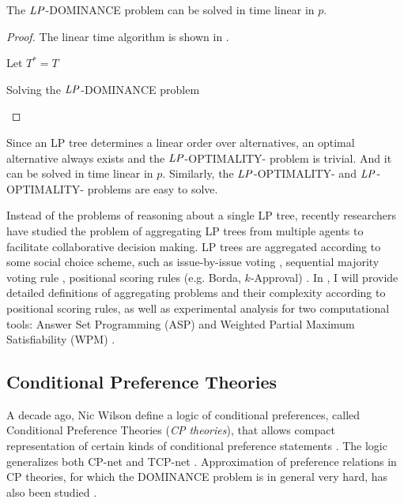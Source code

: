 \begin{thm}
\label{thm:LP_DOM}
	The $\mathit{LP}$-DOMINANCE problem can be solved in time linear in $p$.
\end{thm}
\begin{proof}
	The linear time algorithm is shown in .

	\begin{algorithm}[ht]
	Let $T^* = T$\;
	
	\caption{Solving the $\mathit{LP}$-DOMINANCE problem\label{alg:LP_dom}}
	\end{algorithm}
\end{proof}

Since an LP tree determines a linear order over alternatives, an optimal
alternative always exists and the $\mathit{LP}$-OPTIMALITY- problem
is trivial.  And it can be solved in time linear in $p$.
Similarly, the $\mathit{LP}$-OPTIMALITY- and
$\mathit{LP}$-OPTIMALITY- problems are easy to solve.

Instead of the problems of reasoning about a single
LP tree, recently researchers have studied
the problem of aggregating LP trees from multiple
agents to facilitate collaborative decision making.
LP trees are aggregated
according to some social choice scheme, such as
issue-by-issue voting \cite{fargier:ibi},
sequential majority voting rule \cite{Xia:SMV},
positional scoring rules (e.g. Borda, $k$-Approval) \cite{lang,LiuT}.
In , I will provide detailed definitions of aggregating
problems and their complexity according to positional scoring rules, as
well as experimental analysis for two computational tools:
Answer Set Programming (ASP) \cite{aspataglance} and 
Weighted Partial Maximum Satisfiability (WPM) \cite{papado:b:compcomplexity}.

\subsection{Conditional Preference Theories}
A decade ago, Nic Wilson define a logic of conditional preferences,
called Conditional Preference Theories (\textit{CP theories}), that allows
compact representation of certain kinds of conditional preference
statements \cite{Wilson04extendingcp-nets}.
The logic generalizes both CP-net \cite{Wilson04extendingcp-nets} and TCP-net
\cite{WilsonECAI04}.  Approximation of preference relations
in CP theories, for which the DOMINANCE problem is in general very hard,
has also been studied \cite{Wilson:2006:EUA:1567016.1567119}.


